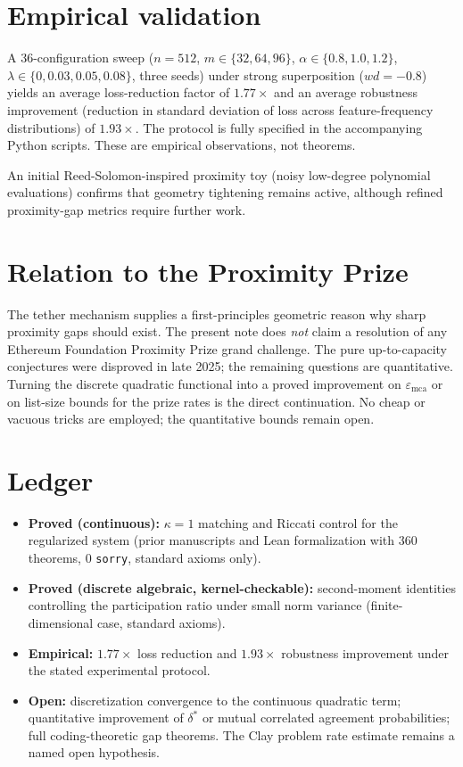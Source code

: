 \documentclass[11pt,a4paper]{article}
\begin{document}
\section{Empirical validation}
A 36-configuration sweep ($n=512$, $m\in\{32,64,96\}$, $\alpha\in\{0.8,1.0,1.2\}$, $\lambda\in\{0,0.03,0.05,0.08\}$, three seeds) under strong superposition ($wd=-0.8$) yields an average loss-reduction factor of $1.77\times$ and an average robustness improvement (reduction in standard deviation of loss across feature-frequency distributions) of $1.93\times$. The protocol is fully specified in the accompanying Python scripts. These are empirical observations, not theorems.

An initial Reed-Solomon-inspired proximity toy (noisy low-degree polynomial evaluations) confirms that geometry tightening remains active, although refined proximity-gap metrics require further work.

\section{Relation to the Proximity Prize}
The tether mechanism supplies a first-principles geometric reason why sharp proximity gaps should exist. The present note does \emph{not} claim a resolution of any Ethereum Foundation Proximity Prize grand challenge. The pure up-to-capacity conjectures were disproved in late 2025; the remaining questions are quantitative. Turning the discrete quadratic functional into a proved improvement on $\varepsilon_{\mathrm{mca}}$ or on list-size bounds for the prize rates is the direct continuation. No cheap or vacuous tricks are employed; the quantitative bounds remain open.

\section{Ledger}
\begin{itemize}[leftmargin=*]
\item \textbf{Proved (continuous):} $\kappa=1$ matching and Riccati control for the regularized system (prior manuscripts and Lean formalization with 360 theorems, 0 \texttt{sorry}, standard axioms only).
\item \textbf{Proved (discrete algebraic, kernel-checkable):} second-moment identities controlling the participation ratio under small norm variance (finite-dimensional case, standard axioms).
\item \textbf{Empirical:} $1.77\times$ loss reduction and $1.93\times$ robustness improvement under the stated experimental protocol.
\item \textbf{Open:} discretization convergence to the continuous quadratic term; quantitative improvement of $\delta^*$ or mutual correlated agreement probabilities; full coding-theoretic gap theorems. The Clay problem rate estimate remains a named open hypothesis.
\end{itemize}
\end{document}
